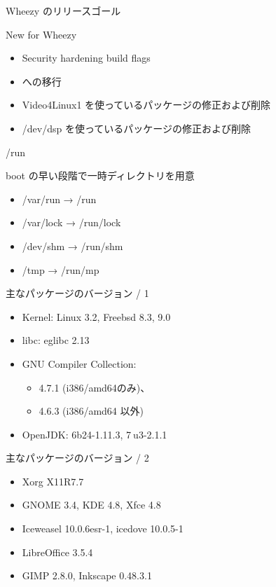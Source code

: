 \documentclass[cjk,dvipdfmx,12pt,compress,%
hyperref={bookmarks=true,bookmarksnumbered=true,bookmarksopen=false,%
  colorlinks=false,%
  pdftitle={第 66 回 関西 Debian 勉強会@KOF2012},%
  pdfauthor={佐々木洋平},%
  pdfsubject={資料},%
}]{beamer}
\begin{document}
\begin{frame}{Wheezy のリリースゴール}

New for Wheezy
\begin{itemize}

  \item Security hardening build flags
  \item {\color{red}{/run} への移行}
  \item Video4Linux1 を使っているパッケージの修正および削除
  \item /dev/dsp を使っているパッケージの修正および削除

\end{itemize}

\end{frame}


\begin{frame}{/run}

boot の早い段階で一時ディレクトリを用意
\begin{itemize}
  \item /var/run → /run
  \item /var/lock → /run/lock
  \item /dev/shm → /run/shm
  \item /tmp → /run/mp
\end{itemize}

\end{frame}



\begin{frame}{主なパッケージのバージョン / 1}

\begin{itemize}
  \item Kernel: Linux 3.2, Freebsd 8.3, 9.0
  \item libc: eglibc 2.13
  \item GNU Compiler Collection:
    \begin{itemize}
    \item 4.7.1 (i386/amd64のみ)、
    \item 4.6.3 (i386/amd64 以外)
    \end{itemize}
  \item OpenJDK: 6b24-1.11.3, 7$~$u3-2.1.1
\end{itemize}

\end{frame}

\begin{frame}{主なパッケージのバージョン / 2}

\begin{itemize}
  \item  Xorg X11R7.7
  \item  GNOME 3.4, KDE 4.8, Xfce 4.8
  \item  Iceweasel 10.0.6esr-1, icedove 10.0.5-1
  \item  LibreOffice 3.5.4
  \item  GIMP 2.8.0, Inkscape 0.48.3.1
\end{itemize}

\end{frame}
\end{document}
